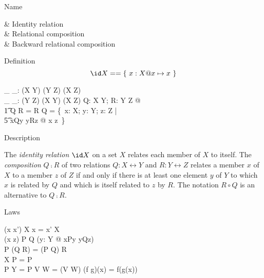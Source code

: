 \begin{manpage}\label{p:1030}
\item[Name]
\begin{name}
        \id & Identity relation \\
        \comp   & Relational composition%
		\symdex{$\semi$} \\
	\circ	& Backward relational composition%
		\symdex{$\circ$}%
\end{name}

\item[Definition]
\[ \id X  ==  \{~x: X @ x \mapsto x~\} \]
\begin{gendef}[X,Y,Z]
        \_ \comp \_: (X \rel Y) \cross (Y \rel Z) \fun (X \rel Z) \\
	\_ \circ \_: (Y \rel Z) \cross (X \rel Y) \fun (X \rel Z)
\where
        \forall Q: X \rel Y; R: Y \rel Z @ \\
\t1         Q \comp R = R \circ Q = \{~x: X; y: Y; z: Z | \\
\t5            		\reln xQy \land \reln yRz @ x \mapsto z~\}
\end{gendef}

\item[Description]

The {\em identity relation\/} $\id X$ on a set $X$ relates each member of
$X$ to itself. The {\em composition\/} $Q \comp R$ of two relations $Q: X
\rel Y$ and $R: Y \rel Z$ relates a member $x$ of $X$ to a member $z$
of $Z$ if and only if there is at least one element $y$ of $Y$ to which
$x$ is related by $Q$ and which is itself related to $z$ by $R$. The
notation $R \circ Q$ is an alternative to $Q \comp R$.

\item[Laws]
\begin{laws}
        (x \mapsto x') \in \id X \iff x = x' \in X \\
        (x \mapsto z) \in P \comp Q \iff
                (\exists y: Y @ \reln xPy \land	\reln yQz) \\
\also
        P \comp (Q \comp R) = (P \comp Q) \comp R \\
        \id X \comp P = P \\
        P \comp \id Y = P
\also
        \id V \comp \id W = \id (V \cap W)
\also
	(f \circ g)(x) = f(g(x))
\end{laws}
\end{manpage}
